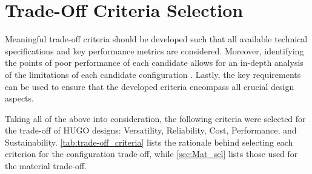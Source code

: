 \section{Trade-Off Criteria Selection}
\label{sec:trade-off_criteria_selection}
Meaningful trade-off criteria should be developed such that all available technical specifications and key performance metrics are considered. Moreover, identifying the points of poor performance of each candidate allows for an in-depth analysis of the limitations of each candidate configuration \cite{SMAD}. Lastly, the key requirements can be used to ensure that the developed criteria encompass all crucial design aspects.

Taking all of the above into consideration, the following criteria were selected for the trade-off of HUGO designs: Versatility, Reliability, Cost, Performance, and Sustainability. \autoref{tab:trade-off_criteria} lists the rationale behind selecting each criterion for the configuration trade-off, while \autoref{sec:Mat_sel} lists those used for the material trade-off.

